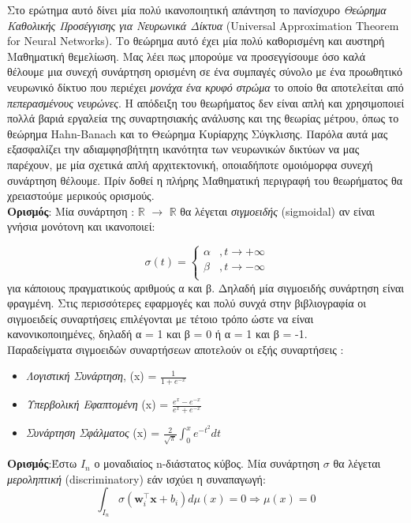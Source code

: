 \documentclass[11pt]{article} %
\begin{document}
Στο ερώτημα αυτό δίνει μία πολύ ικανοποιητική απάντηση το πανίσχυρο \textit{Θεώρημα Καθολικής Προσέγγισης για Νευρωνικά Δίκτυα} (Universal Approximation Theorem for Neural Networks). Το θεώρημα αυτό έχει μία πολύ καθορισμένη και αυστηρή Μαθηματική θεμελίωση.  Μας λέει πως μπορούμε να προσεγγίσουμε όσο καλά θέλουμε μια συνεχή συνάρτηση ορισμένη σε ένα συμπαγές σύνολο με ένα προωθητικό νευρωνικό δίκτυο που περιέχει \textit{μονάχα ένα κρυφό στρώμα} το οποίο θα αποτελείται από \textit{πεπερασμένους νευρώνες}. Η απόδειξη του θεωρήματος δεν είναι απλή και χρησιμοποιεί πολλά βαριά εργαλεία της συναρτησιακής ανάλυσης και της θεωρίας μέτρου, όπως το θεώρημα Hahn-Banach και το Θεώρημα Κυρίαρχης Σύγκλισης. Παρόλα αυτά μας εξασφαλίζει την αδιαμφησβήτητη ικανότητα των νευρωνικών δικτύων να μας παρέχουν, με μία σχετικά απλή αρχιτεκτονική, οποιαδήποτε ομοιόμορφα συνεχή συνάρτηση θέλουμε. Πρίν δοθεί η πλήρης Μαθηματική περιγραφή του θεωρήματος θα χρειαστούμε μερικούς ορισμούς. \\ 

\textbf{Ορισμός}: Μία συνάρτηση \sigma : $\mathbb{R}$ $\rightarrow$ $\mathbb{R}$ θα λέγεται \textit{σιγμοειδής} (sigmoidal) αν είναι γνήσια μονότονη και ικανοποιεί: 

\[ 
\ \sigma(t) = \left\{
\begin{array}{ll}
      α & , t \rightarrow +\infty \\
      β & , t \rightarrow -\infty \\
\end{array} 
\right. 
\]
για κάποιους πραγματικούς αριθμούς α και β. Δηλαδή μία σιγμοειδής συνάρτηση είναι φραγμένη.  Στις περισσότερες εφαρμογές και πολύ συνχά στην βιβλιογραφία οι σιγμοειδείς συναρτήσεις επιλέγονται με τέτοιο τρόπο ώστε να είναι κανονικοποιημένες, δηλαδή α = 1 και β = 0 ή α = 1 και β = -1. \\

 Παραδείγματα σιγμοειδών συναρτήσεων αποτελούν οι εξής συναρτήσεις : \\
\begin{itemize}
  \item \textit{Λογιστική Συνάρτηση}, \sigma(x) = $\frac{1}{1 + e^{-x}}$ 
  \item \textit{Υπερβολική Εφαπτομένη} \sigma(x) = $\frac{e^x - e^{-x}}{e^x + e^{-x}}$
  \item \textit{Συνάρτηση Σφάλματος} \sigma(x) = $\displaystyle \frac{2}{\sqrt{\pi}} \int_{0}^{x} e^{-t^2} dt$
\end{itemize}


\textbf{Ορισμός}:Έστω $Ι_n$ ο μοναδιαίος n-διάστατος κύβος. Μία συνάρτηση $\sigma$ θα λέγεται \textit{μεροληπτική} (discriminatory) εάν ισχύει η συναπαγωγή: \\
\begin{equation}
 \displaystyle \int_{I_n} \sigma(\textbf{w}_i ^\intercal \mathbf{x} + b_i) d\mu(x) = 0 \Rightarrow \mu(x) = 0  
\end{equation} 
\end{document}
